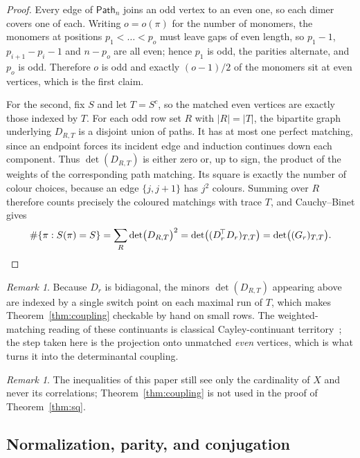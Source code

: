 \documentclass[11pt,a4paper]{article}
\theoremstyle{plain}
\theoremstyle{definition}
\theoremstyle{remark}
\newtheorem{remark}[theorem]{Remark}
\begin{document}
\begin{proof}
Every edge of $\mathsf{Path}_n$ joins an odd vertex to an even one, so each dimer covers one
of each. Writing $o=o(\pi)$ for the number of monomers, the monomers at positions
$p_1<\dots<p_o$ must leave gaps of even length, so $p_1-1$, $p_{i+1}-p_i-1$ and
$n-p_o$ are all even; hence $p_1$ is odd, the parities alternate, and $p_o$ is
odd. Therefore $o$ is odd and exactly $(o-1)/2$ of the monomers sit at even
vertices, which is the first claim.

For the second, fix $S$ and let $T=S^c$, so the matched even vertices are exactly
those indexed by $T$. For each odd row set $R$ with $|R|=|T|$, the bipartite
graph underlying $D_{R,T}$ is a disjoint union of paths. It has at most one
perfect matching, since an endpoint forces its incident edge and induction
continues down each component. Thus $\det(D_{R,T})$ is either zero or, up to
sign, the product of the weights of the corresponding path matching. Its square
is exactly the number of colour choices, because an edge $\{j,j+1\}$ has $j^2$
colours. Summing over $R$ therefore counts precisely the coloured matchings with
trace $T$, and Cauchy--Binet gives
\[
  \#\{\pi:S(\pi)=S\}=\sum_R\det\bigl(D_{R,T}\bigr)^2
  =\det\bigl((D_r^{\!\top}D_r)_{T,T}\bigr)=\det\bigl((G_r)_{T,T}\bigr).
\qedhere
\]
\end{proof}

\begin{remark}
Because $D_r$ is bidiagonal, the minors $\det(D_{R,T})$ appearing above are
indexed by a single switch point on each maximal run of $T$, which makes
Theorem~\ref{thm:coupling} checkable by hand on small rows. The weighted-matching
reading of these continuants is classical Cayley-continuant
territory~\cite{chenWang2024}; the step taken here is the projection onto unmatched
\emph{even} vertices, which is what turns it into the determinantal coupling.
\end{remark}

\begin{remark}
The inequalities of this paper still see only the cardinality of $X$ and never
its correlations; Theorem~\ref{thm:coupling} is not used in the proof of
Theorem~\ref{thm:sq}.
\end{remark}

\subsection{Normalization, parity, and conjugation}
\end{document}
